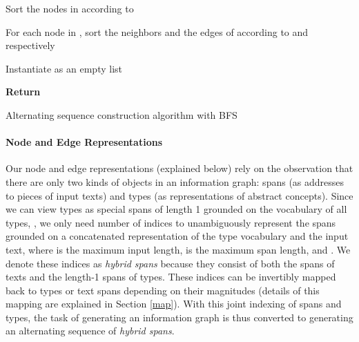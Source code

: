 \documentclass[11pt,a4paper]{article}
\begin{document}
 \begin{algorithm}[H]
\SetAlgoLined
{}


 
\BlankLine

Sort the nodes in  according to 

For each node  in , sort the neighbors and the edges of  according to  and  respectively

Instantiate  as an empty list

 \textbf{Return} 
 \caption{Alternating sequence construction algorithm with BFS}
\end{algorithm}




\paragraph{Node and Edge Representations}
Our node and edge representations (explained below) rely on the observation that there are only two kinds of objects in an information graph: spans (as addresses to pieces of input texts) and types (as representations of abstract concepts). Since we can view types as special spans of length 1 grounded on the vocabulary of all types, , we only need  number of indices to unambiguously represent the spans grounded on a concatenated representation of the type vocabulary and the input text, where  is the maximum input length,  is the maximum span length, and  . We denote these indices as \emph{hybrid spans} because they consist of both the spans of texts and the length-1 spans of types. These indices can be invertibly mapped back to types or text spans depending on their magnitudes (details of this mapping are explained in Section \ref{map}). With this joint indexing of spans and types, the task of generating an information graph is thus converted to generating an alternating sequence of \emph{hybrid spans}.
\end{document}
